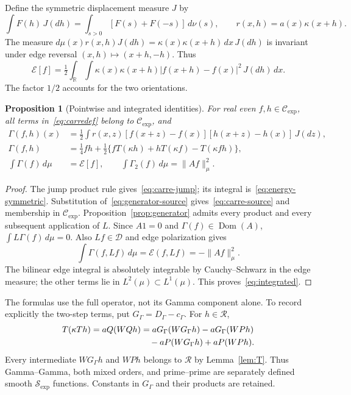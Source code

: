 \documentclass[11pt,a4paper]{article}
\numberwithin{equation}{section}
\newtheorem{proposition}[theorem]{Proposition}
\theoremstyle{definition}
\theoremstyle{remark}
\newcommand{\R}{\mathbb R}
\newcommand{\E}{\mathcal E}
\newcommand{\D}{\mathcal D}
\newcommand{\cg}{c_{\Gamma}}
\newcommand{\dom}{\operatorname{Dom}}
\newcommand{\norm}[1]{\lVert #1\rVert}
\newcommand{\RR}{\mathcal R}
\newcommand{\SSS}{\mathcal S_{\!\exp}}
\newcommand{\CE}{\mathcal C_{\exp}}
\begin{document}
Define the symmetric displacement measure $J$ by
\[
 \int F(h)\,J(dh)=\int_{s>0}[F(s)+F(-s)]\,d\nu(s),
 \qquad r(x,h)=a(x)\kappa(x+h).
\]
The measure $d\mu(x)r(x,h)J(dh)=\kappa(x)\kappa(x+h)\,dx\,J(dh)$ is invariant under edge reversal $(x,h)\mapsto(x+h,-h)$. Thus
\begin{equation}\label{eq:energy-symmetric}
 \E[f]=\tfrac12\int_\R\int
       \kappa(x)\kappa(x+h)|f(x+h)-f(x)|^2\,J(dh)\,dx.
\end{equation}
The factor $1/2$ accounts for the two orientations.

\begin{proposition}[Pointwise and integrated identities]\label{prop:carre}
For real even $f,h\in\CE$, all terms in~\eqref{eq:carredef} belong to $\CE$, and
\begin{align}
 \Gamma(f,h)(x)&=\tfrac12\int r(x,z)
   [f(x+z)-f(x)][h(x+z)-h(x)]\,J(dz),\label{eq:carre-jump}\\
 \Gamma(f,h)&=\tfrac14fh+\tfrac12
   \{fT(\kappa h)+hT(\kappa f)-T(\kappa fh)\},\label{eq:carre-source}\\
 \int\Gamma(f)\,d\mu&=\E[f],\qquad
 \int\Gamma_2(f)\,d\mu=\norm{Af}_\mu^2.\label{eq:integrated}
\end{align}
\end{proposition}
\begin{proof}
The jump product rule gives~\eqref{eq:carre-jump}; its integral is~\eqref{eq:energy-symmetric}. Substitution of~\eqref{eq:generator-source} gives~\eqref{eq:carre-source} and membership in $\CE$. Proposition~\ref{prop:generator} admits every product and every subsequent application of $L$. Since $A1=0$ and $\Gamma(f)\in\dom(A)$,
$\int L\Gamma(f)\,d\mu=0$. Also $Lf\in\D$ and edge polarization gives
\[
 \int\Gamma(f,Lf)\,d\mu=\E(f,Lf)=-\norm{Af}_\mu^2.
\]
The bilinear edge integral is absolutely integrable by Cauchy--Schwarz in the edge measure; the other terms lie in $L^2(\mu)\subset L^1(\mu)$. This proves~\eqref{eq:integrated}.
\end{proof}

The formulas use the full operator, not its Gamma component alone. To record explicitly the two-step terms, put $G_\Gamma=D_\Gamma-\cg$. For $h\in\RR$,
\begin{align}\label{eq:mixed}
 T(\kappa Th)=aQ(WQh)
 &=aG_\Gamma(WG_\Gamma h)-aG_\Gamma(WPh)\notag\\
 &\quad-aP(WG_\Gamma h)+aP(WPh).
\end{align}
Every intermediate $WG_\Gamma h$ and $WPh$ belongs to $\RR$ by Lemma~\ref{lem:T}. Thus Gamma--Gamma, both mixed orders, and prime--prime are separately defined smooth $\SSS$ functions. Constants in $G_\Gamma$ and their products are retained.
\end{document}
